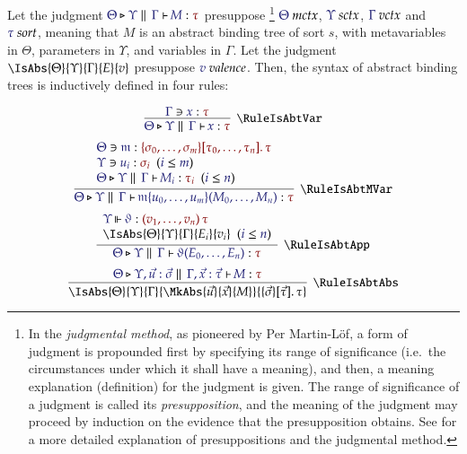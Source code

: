 Let the judgment $\IsAbt{\Theta}{\Upsilon}{\Gamma}{M}{\tau}$ presuppose
\footnote{
  In the \emph{judgmental method}, as pioneered by Per Martin-L\"of, a form of
  judgment is propounded first by specifying its range of significance (i.e.\
  the circumstances under which it shall have a meaning), and then, a meaning
  explanation (definition) for the judgment is given. The range of significance
  of a judgment is called its \emph{presupposition}, and the meaning of the
  judgment may proceed by induction on the evidence that the presupposition
  obtains. See \cite{schroeder-heister:1987} for a more detailed explanation of
  presuppositions and the judgmental method.
}
$\IsMetaCtx{\Theta}$, $\IsSymCtx\Upsilon$, $\IsVarCtx\Gamma$ and
$\IsSort{\tau}$, meaning that $M$ is an abstract binding tree of sort $s$, with
metavariables in $\Theta$, parameters in $\Upsilon$, and variables in $\Gamma$.
Let the judgment $\IsAbs{\Theta}{\Upsilon}{\Gamma}{E}{v}$ presuppose
$\IsValence{v}$. Then, the syntax of abstract binding trees is inductively
defined in four rules:

\[
  \infer[\RuleIsAbtVar]{
    \IsAbt{\Theta}{\Upsilon}{\Gamma}{x}{\tau}
  }{
    \Lookup{\Gamma}{x}{\tau}
  }
\]
\[
  \infer[\RuleIsAbtMVar]{
    \IsAbt{\Theta}{\Upsilon}{\Gamma}{
      \MApp{\MV{m}}{u_0,\dots,u_m}{M_0,\dots,M_n}
    }{\tau}
  }{
    \begin{array}{l}
      \Lookup{\Theta}{\MV{m}}{
        \MkValence{
          \sigma_0,\dots,\sigma_m
        }{
          \tau_0,\dots,\tau_n
        }{\tau}
      }
\\
      \HypJ{
        \Lookup{\Upsilon}{u_i}{\sigma_i}
      }{\Leq{i}{m}}
\\
      \HypJ{
        \IsAbt{\Theta}{\Upsilon}{\Gamma}{M_i}{\tau_i}
      }{\Leq{i}{n}}
    \end{array}
  }
\]
\[
  \infer[\RuleIsAbtApp]{
    \IsAbt{\Theta}{\Upsilon}{\Gamma}{
      \App{\vartheta}{E_0,\dots,E_n}
    }{\tau}
  }{
    \begin{array}{l}
      \IsOperator{\Upsilon}{\vartheta}{
        \MkArity{v_1,\dots,v_n}{\tau}
      }
\\
      \HypJ{
        \IsAbs{\Theta}{\Upsilon}{\Gamma}{E_i}{v_i}
      }{\Leq{i}{n}}
    \end{array}
  }
\]
\[
  \infer[\RuleIsAbtAbs]{
    \IsAbs{\Theta}{\Upsilon}{\Gamma}{
      \MkAbs{\vec{u}}{\vec{x}}{M}
    }{
      \MkValence{\vec{\sigma}}{\vec{\tau}}{\tau}
    }
  }{
    \IsAbt{
      \Theta
    }{
      \Upsilon, \vec{u}:\vec{\sigma}
    }{
      \Gamma,\vec{x}:{\vec{\tau}}
    }{
      M
    }{\tau}
  }
\]

